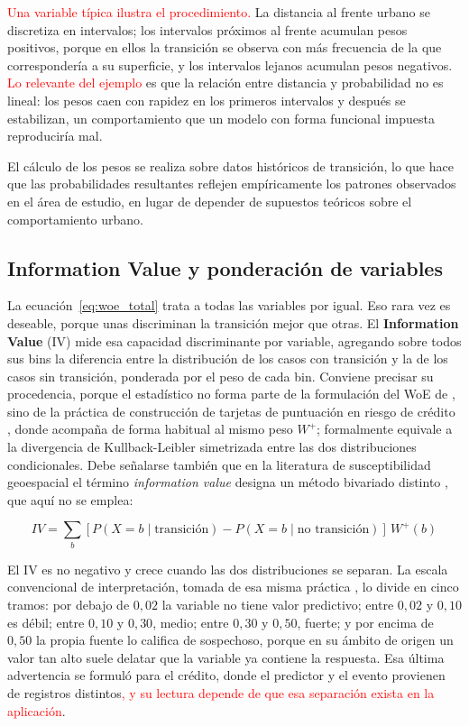\textcolor{red}{Una variable típica ilustra el procedimiento.} La distancia al frente urbano se discretiza en intervalos; los intervalos próximos al frente acumulan pesos positivos, porque en ellos la transición se observa con más frecuencia de la que correspondería a su superficie, y los intervalos lejanos acumulan pesos negativos. \textcolor{red}{Lo relevante del ejemplo} es que la relación entre distancia y probabilidad no es lineal: los pesos caen con rapidez en los primeros intervalos y después se estabilizan, un comportamiento que un modelo con forma funcional impuesta reproduciría mal.

El cálculo de los pesos se realiza sobre datos históricos de transición, lo que hace que las probabilidades resultantes reflejen empíricamente los patrones observados en el área de estudio, en lugar de depender de supuestos teóricos sobre el comportamiento urbano.

\subsection{Information Value y ponderación de variables}
\label{ssec:information-value}

La ecuación~\ref{eq:woe_total} trata a todas las variables por igual. Eso rara vez es deseable, porque unas discriminan la transición mejor que otras. El \textbf{Information Value} (IV) mide esa capacidad discriminante por variable, agregando sobre todos sus bins la diferencia entre la distribución de los casos con transición y la de los casos sin transición, ponderada por el peso de cada bin. Conviene precisar su procedencia, porque el estadístico no forma parte de la formulación del WoE de \textcite{BonhamCarter1994}, sino de la práctica de construcción de tarjetas de puntuación en riesgo de crédito \parencite{Siddiqi2006}, donde acompaña de forma habitual al mismo peso $W^+$; formalmente equivale a la divergencia de Kullback-Leibler simetrizada entre las dos distribuciones condicionales. Debe señalarse también que en la literatura de susceptibilidad geoespacial el término \textit{information value} designa un método bivariado distinto \parencite{YinYan1988}, que aquí no se emplea:

\begin{equation}
IV = \sum_{b} \left[ P(X = b \mid \text{transición}) - P(X = b \mid \text{no transición}) \right] \, W^+(b)
\label{eq:information_value}
\end{equation}

El IV es no negativo y crece cuando las dos distribuciones se separan. La escala convencional de interpretación, tomada de esa misma práctica \parencite{Siddiqi2006}, lo divide en cinco tramos: por debajo de $0{,}02$ la variable no tiene valor predictivo; entre $0{,}02$ y $0{,}10$ es débil; entre $0{,}10$ y $0{,}30$, medio; entre $0{,}30$ y $0{,}50$, fuerte; y por encima de $0{,}50$ la propia fuente lo califica de sospechoso, porque en su ámbito de origen un valor tan alto suele delatar que la variable ya contiene la respuesta. Esa última advertencia se formuló para el crédito, donde el predictor y el evento provienen de registros distintos\textcolor{red}{, y su lectura depende de que esa separación exista en la aplicación}.

